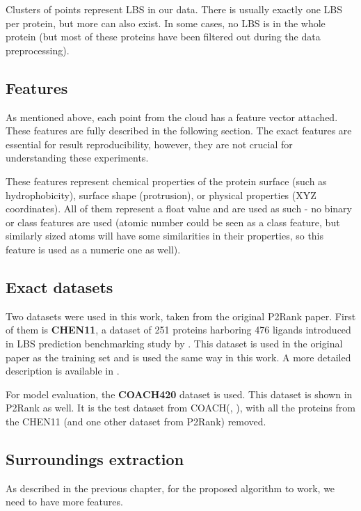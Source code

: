 Clusters of points represent LBS in our data. There is usually exactly one LBS per protein, but more can also exist. In some cases, no LBS is in the whole protein (but most of these proteins have been filtered out during the data preprocessing).

\subsection{Features}

As mentioned above, each point from the cloud has a feature vector attached. These features are fully described in the following section. The exact features are essential for result reproducibility, however, they are not crucial for understanding these experiments. 

These features represent chemical properties of the protein surface (such as hydrophobicity), surface shape (protrusion), or physical properties (XYZ coordinates). All of them represent a float value and are used as such - no binary or class features are used (atomic number could be seen as a class feature, but similarly sized atoms will have some similarities in their properties, so this feature is used as a numeric one as well).

\subsection{Exact datasets}

Two datasets were used in this work, taken from the original P2Rank paper. First of them is \textbf{CHEN11}, a dataset of 251 proteins harboring 476 ligands introduced in LBS prediction benchmarking study by \cite{chen11}. This dataset is used in the original paper as the training set and is used the same way in this work. A more detailed description is available in \cite{chen11}.

For model evaluation, the \textbf{COACH420} dataset is used. This dataset is shown in P2Rank as well. It is the test dataset from COACH(\cite{coach1}, \cite{coach2}), with all the proteins from the CHEN11 (and one other dataset from P2Rank) removed. 

\subsection{Surroundings extraction}
\label{Surroundings}

As described in the previous chapter, for the proposed algorithm to work, we need to have more features.

